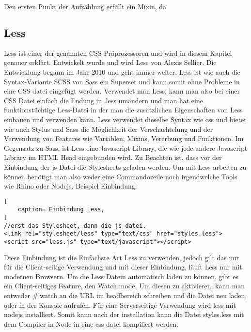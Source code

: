 Den ersten Punkt der Aufzählung erfüllt ein Mixin, da 
\newpage
\subsection{Less}
Less ist einer der genannten CSS-Präprozessoren und wird in diesem Kapitel genauer erklärt.\newline
Entwickelt wurde und wird Less von Alexis Sellier. Die Entwicklung begann im Jahr 2010 und geht immer weiter.\newline
Less ist wie auch die Syntax-Variante SCSS von Sass ein Superset und kann somit ohne Probleme in eine CSS datei eingefügt werden. Verwendet man Less, kann man also bei einer CSS Datei einfach die Endung in .less umändern und man hat eine funktionstüchtige Less-Datei in der man die zusätzlichen Eigenschaften von Less einbauen und verwenden kann. \newline
Less verwendet dieselbe Syntax wie css und bietet wie auch Stylus und Sass die Möglichkeit der Verschachtelung und der Verwendung von Features wie Variablen, Mixins, Vererbung und Funktionen.\newline
Im Gegensatz zu Sass, ist Less eine Javascript Library, die wie jede andere Javascript Library im HTML Head eingebunden wird. Zu Beachten ist, dass vor der Einbindung der js Datei die Stylesheets geladen werden. \newline
Um mit Less arbeiten zu können benötigt man also weder eine Commandozeile noch irgendwelche Tools wie Rhino oder Nodejs.
Beispiel Einbindung:
\begin{lstlisting}[
	caption= Einbindung Less,
]
//erst das Stylesheet, dann die js datei.
<link rel="stylesheet/less" type="text/css" href="styles.less">
<script src="less.js" type="text/javascript"></script>    
\end{lstlisting}
Diese Einbindung ist die Einfachste Art Less zu verwenden, jedoch gilt das nur für die Client-seitige Verwendung und mit dieser Einbindung, läuft Less nur mit modernen Browsern.\newline
Um die Less Datein automatisch laden zu können, gibt es ein Client-seitiges Feature, den Watch mode. Um diesen zu aktivieren, kann man entweder \grqq\#!watch\glqq{} an die URL im headbereich schreiben und die Datei neu laden, oder in der Konsole \glqq{}   aufrufen.\newline
Für eine Serverseitige Verwendung wird less mit nodejs installiert. Somit kann nach der installation kann die Datei styles.less mit dem Compiler in Node in eine css datei kompiliert werden.\autocite[]{Sellier.2013}

